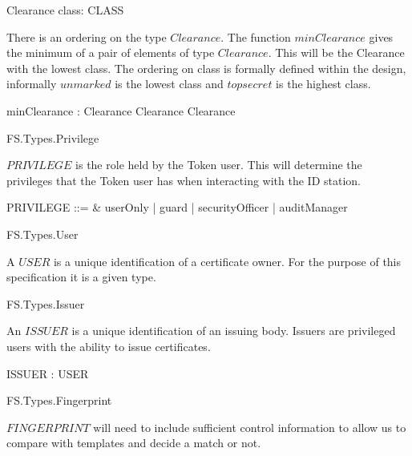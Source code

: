 \begin{schema}{Clearance}
	class: CLASS
\end{schema}

There is an ordering on the type $Clearance$. The function
$minClearance$  gives the minimum of a
pair of elements of type $Clearance$. This will be the Clearance with
the lowest class. The ordering on class is formally defined within the
design, informally $unmarked$ is the lowest class and $topsecret$ is
the highest class. 

\begin{axdef}
        minClearance : Clearance \cross Clearance \fun Clearance
\end{axdef}

\begin{traceunit}{FS.Types.Privilege}
\end{traceunit}


$PRIVILEGE$ is the role held by the Token user. This will determine
the privileges that the Token user has when interacting with the ID
station.
\begin{syntax}
        PRIVILEGE ::= & userOnly | guard | securityOfficer | auditManager 
\end{syntax}

\begin{traceunit}{FS.Types.User}
\end{traceunit}


A $USER$ is a unique identification of a certificate owner. For the
purpose of this specification it is a given type. 
 
\begin{zed}
	[ USER ]
\end{zed}

\begin{traceunit}{FS.Types.Issuer}
\end{traceunit}


An $ISSUER$ is a unique identification of an issuing body. Issuers are
privileged users with the ability to issue certificates. 
 
\begin{axdef}
ISSUER : \power USER
\end{axdef}

\begin{traceunit}{FS.Types.Fingerprint}
\end{traceunit}


$FINGERPRINT$ will need to include sufficient control information to allow
us to compare with templates and decide a match or not.
\begin{zed}
	[ FINGERPRINT ]
\end{zed}

